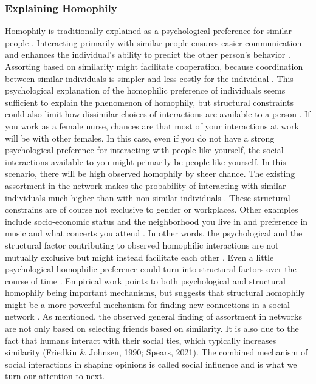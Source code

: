 \documentclass{article}
\begin{document}
\subsubsection{Explaining Homophily}
Homophily is traditionally explained as a psychological preference for similar people \cite{asikainen_cumulative_2020,mcpherson_birds_2001,winter_you_2020}. Interacting primarily with similar people ensures easier communication and enhances the individual’s ability to predict the other person’s behavior \cite{kossinets_origins_2009,winter_you_2020}. Assorting based on similarity might facilitate cooperation, because coordination between similar individuals is simpler and less costly for the individual \cite{winter_you_2020}. This psychological explanation of the homophilic preference of individuals seems sufficient to explain the phenomenon of homophily, but structural constraints could also limit how dissimilar choices of interactions are available to a person \cite{peixoto_disentangling_2022}. If you work as a female nurse, chances are that most of your interactions at work will be with other females. In this case, even if you do not have a strong psychological preference for interacting with people like yourself, the social interactions available to you might primarily be people like yourself. In this scenario, there will be high observed homophily by sheer chance. The existing assortment in the network makes the probability of interacting with similar individuals much higher than with non-similar individuals \cite{peixoto_disentangling_2022}. These structural constrains are of course not exclusive to gender or workplaces. Other examples include socio-economic status and the neighborhood you live in and preference in music and what concerts you attend \cite{mcpherson_birds_2001}. In other words, the psychological and the structural factor contributing to observed homophilic interactions are not mutually exclusive but might instead facilitate each other \cite{asikainen_cumulative_2020}. Even a little psychological homophilic preference could turn into structural factors over the course of time \cite{asikainen_cumulative_2020,kossinets_origins_2009,taylor_exploring_2018}. Empirical work points to both psychological and structural homophily being important mechanisms, but suggests that structural homophily might be a more powerful mechanism for finding new connections in a social network \cite{bener_empirical_2016,kossinets_origins_2009}.
As mentioned, the observed general finding of assortment in networks are not only based on selecting friends based on similarity. It is also due to the fact that humans interact with their social ties, which typically increases similarity (Friedkin \& Johnsen, 1990; Spears, 2021). The combined mechanism of social interactions in shaping opinions is called social influence and is what we turn our attention to next. 
\end{document}
